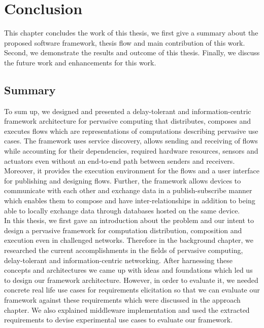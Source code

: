 
\chapter{Conclusion}\label{chapter:conclusion}

This chapter concludes the work of this thesis, we first give a summary about the proposed software framework,  thesis flow and  main contribution of this work. Second, we demonstrate the results and  outcome of this thesis. Finally, we discuss the future work and enhancements for  this work. 

\section{Summary}
To sum up, we designed and presented a delay-tolerant and information-centric framework architecture for pervasive computing  that distributes, composes and executes flows which are representations of computations describing pervasive use cases. The framework uses  service discovery, allows sending and receiving of flows while accounting for their dependencies, required hardware resources, sensors and actuators even without an end-to-end path between senders and receivers. Moreover, it provides the execution environment for the flows and a user interface for publishing and designing flows. Further, the framework allows devices to communicate with each other and exchange data in a publish-subscribe manner which enables them to compose and have inter-relationships in addition to  being able to locally exchange data through databases hosted on the same device. \\

\noindent In this thesis, we first gave an introduction about the problem and our intent to design a pervasive framework for computation distribution, composition and execution even in challenged networks. Therefore in the background chapter, we researched the current accomplishments in the fields of pervasive computing, delay-tolerant and information-centric networking. After harnessing these concepts and architectures we came up with ideas and foundations which led us to design our framework architecture. However, in order to evaluate it, we needed concrete real life use cases for  requirements elicitation so that we can evaluate our framework against these requirements which were discussed in the approach chapter. We also explained middleware implementation and used the extracted requirements to devise experimental use cases to evaluate our framework.\\

